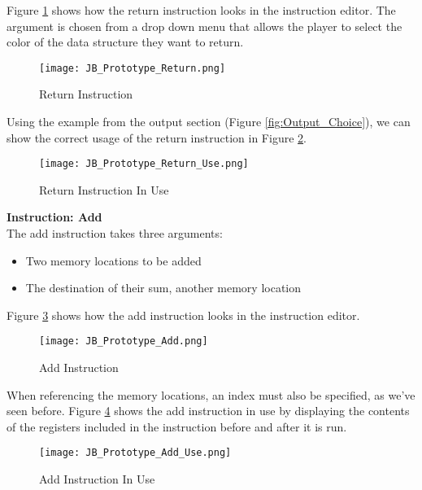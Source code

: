 Figure \ref{fig:Return_Instruction} shows how the return instruction looks in the instruction editor.
The argument is chosen from a drop down menu that allows the player to select
the color of the data structure they want to return.\\

\begin{figure}[!htb]
	\caption{Return Instruction}
	\label{fig:Return_Instruction}
	\centering
	\texttt{[image: JB\_Prototype\_Return.png]}
\end{figure}

Using the example from the output section (Figure \ref{fig:Output_Choice}),
we can show the correct usage of the return instruction in Figure \ref{fig:Return_Instruction_Use}.

\begin{figure}[!htb]
	\caption{Return Instruction In Use}
	\label{fig:Return_Instruction_Use}
	\centering
	\texttt{[image: JB\_Prototype\_Return\_Use.png]}
\end{figure}

\textbf{Instruction: Add}\\
The add instruction takes three arguments:
\begin{itemize}
	\item Two memory locations to be added
	\item The destination of their sum, another memory location
\end{itemize}

Figure \ref{fig:Add_Instruction} shows how the add instruction looks in the
instruction editor.

\begin{figure}[!hb]
	\caption{Add Instruction}
	\label{fig:Add_Instruction}
	\centering
	\texttt{[image: JB\_Prototype\_Add.png]}
\end{figure}

When referencing the memory locations, an index must also be specified, as we've
seen before. Figure \ref{fig:Add_Instruction_Use} shows the add instruction in use by displaying
the contents of the registers included in the instruction before and after it is
run.\\

\begin{figure}[!htb]
	\caption{Add Instruction In Use}
	\label{fig:Add_Instruction_Use}
	\centering
	\texttt{[image: JB\_Prototype\_Add\_Use.png]}
\end{figure}

